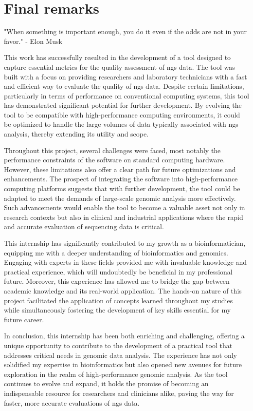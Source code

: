 \chapter{Final remarks}
\label{chapter:Final remarks}

\begin{introduction}
    "When something is important enough, you do it even if the odds are not in your favor." - Elon Musk
\end{introduction}


This work has successfully resulted in the development of a tool designed to capture essential metrics for the quality assessment of \ac{ngs} data. The tool was built with a focus on providing researchers and laboratory technicians with a fast and efficient way to evaluate the quality of \ac{ngs} data. Despite certain limitations, particularly in terms of performance on conventional computing systems, this tool has demonstrated significant potential for further development. By evolving the tool to be compatible with high-performance computing environments, it could be optimized to handle the large volumes of data typically associated with \ac{ngs} analysis, thereby extending its utility and scope.

Throughout this project, several challenges were faced, most notably the performance constraints of the software on standard computing hardware. However, these limitations also offer a clear path for future optimizations and enhancements. The prospect of integrating the software into high-performance computing platforms suggests that with further development, the tool could be adapted to meet the demands of large-scale genomic analysis more effectively. Such advancements would enable the tool to become a valuable asset not only in research contexts but also in clinical and industrial applications where the rapid and accurate evaluation of sequencing data is critical.

This internship has significantly contributed to my growth as a bioinformatician, equipping me with a deeper understanding of bioinformatics and genomics. Engaging with experts in these fields provided me with invaluable knowledge and practical experience, which will undoubtedly be beneficial in my professional future. Moreover, this experience has allowed me to bridge the gap between academic knowledge and its real-world application. The hands-on nature of this project facilitated the application of concepts learned throughout my studies while simultaneously fostering the development of key skills essential for my future career.

In conclusion, this internship has been both enriching and challenging, offering a unique opportunity to contribute to the development of a practical tool that addresses critical needs in genomic data analysis. The experience has not only solidified my expertise in bioinformatics but also opened new avenues for future exploration in the realm of high-performance genomic analysis. As the tool continues to evolve and expand, it holds the promise of becoming an indispensable resource for researchers and clinicians alike, paving the way for faster, more accurate evaluations of \ac{ngs} data.
